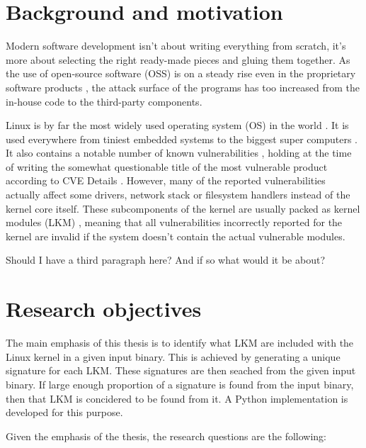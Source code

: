 
\section{Background and motivation}

Modern software development isn't about writing everything from scratch, it's more about selecting
the right ready-made pieces and gluing them together. As the use of open-source software (OSS) is
on a steady rise even in the proprietary software products \cite{deshpande2008total}, the attack
surface of the programs has too increased from the in-house code to the third-party components.

Linux is by far the most widely used operating system (OS) in the world \cite{blah}. It is used
everywhere from tiniest embedded systems \cite{picotux} to the biggest super computers
\cite{top500linuxshare}. It also contains a notable number of known vulnerabilities
\cite{cvedetailslinuxkernel}, holding at the time of writing the somewhat questionable title of the
most vulnerable product according to CVE Details \cite{cvedetailstop50}. However, many of the
reported vulnerabilities actually affect some drivers, network stack or filesystem handlers instead
of the kernel core itself. These subcomponents of the kernel are usually packed as kernel modules
(LKM) \cite{blah}, meaning that all vulnerabilities incorrectly reported for the kernel are invalid
if the system doesn't contain the actual vulnerable modules.

Should I have a third paragraph here? And if so what would it be about?

\section{Research objectives}

The main emphasis of this thesis is to identify what LKM are included with the Linux kernel in a
given input binary. This is achieved by generating a unique signature for each LKM. These
signatures are then seached from the given input binary. If large enough proportion of a signature
is found from the input binary, then that LKM is concidered to be found from it. A Python
implementation is developed for this purpose.

Given the emphasis of the thesis, the research questions are the following:

\label{sect:questions}

